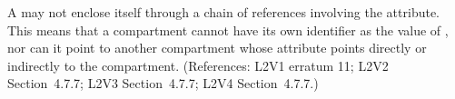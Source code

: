 A \Compartment may not enclose itself through a chain of references
involving the  attribute.  This means that a compartment cannot
have its own identifier as the value of , nor can it point
to another compartment whose  attribute points directly or
indirectly to the compartment.  (References: L2V1 erratum 11; L2V2 Section~4.7.7;
L2V3 Section~4.7.7; L2V4 Section~4.7.7.)
